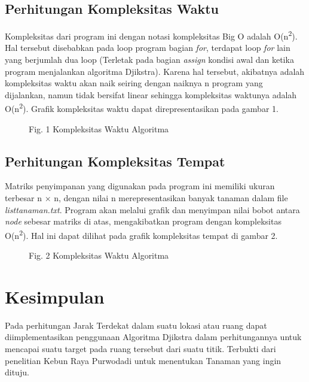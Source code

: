 \documentclass[conference]{IEEEtran}
\begin{document}
\subsection{Perhitungan Kompleksitas Waktu}
Kompleksitas dari program ini dengan notasi kompleksitas Big O adalah O(n\textsuperscript{2}). Hal tersebut disebabkan pada loop program bagian \textit{for}, terdapat loop \textit{for} lain yang berjumlah dua loop (Terletak pada bagian \textit{assign} kondisi awal dan ketika program menjalankan algoritma Djikstra). Karena hal tersebut, akibatnya adalah kompleksitas waktu akan naik seiring dengan naiknya n program yang dijalankan, namun tidak bersifat linear sehingga kompleksitas waktunya
adalah O(n\textsuperscript{2}). Grafik kompleksitas waktu dapat direpresentasikan pada gambar 1.
\begin{figure}[htbp]
    \centering
    \scalebox{0.4}{}
    \caption{Fig. 1 Kompleksitas Waktu Algoritma}
\end{figure}
 
\subsection{Perhitungan Kompleksitas Tempat}
Matriks penyimpanan yang digunakan pada program ini memiliki ukuran terbesar n × n, dengan nilai n merepresentasikan banyak tanaman dalam file \textit{listtanaman.txt}. Program akan melalui grafik dan menyimpan nilai bobot antara \textit{node} sebesar matriks di atas, mengakibatkan program dengan kompleksitas O(n\textsuperscript{2}). Hal ini dapat dilihat pada grafik kompleksitas tempat di gambar 2.
\begin{figure}[htbp]
    \centering
    \scalebox{0.4}{}
    \caption{Fig. 2 Kompleksitas Waktu Algoritma}
\end{figure}
 
\section{Kesimpulan}
Pada perhitungan Jarak Terdekat dalam suatu lokasi atau ruang dapat diimplementasikan penggunaan Algoritma Djikstra dalam perhitungannya untuk mencapai suatu target pada ruang tersebut dari suatu titik. Terbukti dari penelitian Kebun Raya Purwodadi untuk menentukan Tanaman yang ingin dituju.


\end{document}
